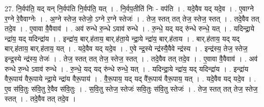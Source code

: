 \documentclass[17pt]{extarticle}
\begin{document}
27. नि॒र्वप॑ति॒ यद् यन् नि॒र्वप॑ति नि॒र्वप॑ति॒ यत् । . नि॒र्वप॒तीति॑ निः - वप॑ति । . यदे॒वैव यद् यदे॒व । . ए॒वाग्ने र॒ग्ने रे॒वैवाग्नेः । . अ॒ग्ने स्तेज॒ स्तेजो॒ ऽग्ने र॒ग्ने स्तेजः॑ । . तेज॒ स्तत् तत् तेज॒ स्तेज॒ स्तत् । . तदे॒वैव तत् तदे॒व । . ए॒वावा वै॒वैवाव॑ । . अव॑ रुन्धे रु॒न्धे ऽवाव॑ रुन्धे । . रु॒न्धे॒ यद् यद् रु॑न्धे रुन्धे॒ यत् । . यदिन्द्रा॒ये न्द्रा॑य॒ यद् यदिन्द्रा॑य । . इन्द्रा॑य॒ बार्.ह॑ताय॒ बार्.ह॑ता॒ये न्द्रा॒ये न्द्रा॑य॒ बार्.ह॑ताय । . बार्.ह॑ताय॒ यद् यद् बार्.ह॑ताय॒ बार्.ह॑ताय॒ यत् । . यदे॒वैव यद् यदे॒व । . ए॒वे न्द्र॒स्ये न्द्र॑स्यै॒वैवे न्द्र॑स्य । . इन्द्र॑स्य॒ तेज॒ स्तेज॒ इन्द्र॒स्ये न्द्र॑स्य॒ तेजः॑ । . तेज॒ स्तत् तत् तेज॒ स्तेज॒ स्तत् । . तदे॒वैव तत् तदे॒व । . ए॒वावा वै॒वैवाव॑ । . अव॑ रुन्धे रु॒न्धे ऽवाव॑ रुन्धे । . रु॒न्धे॒ यद् यद् रु॑न्धे रुन्धे॒ यत् । . यदिन्द्रा॒ये न्द्रा॑य॒ यद् यदिन्द्रा॑य । . इन्द्रा॑य वैरू॒पाय॑ वैरू॒पाये न्द्रा॒ये न्द्रा॑य वैरू॒पाय॑ । . वै॒रू॒पाय॒ यद् यद् वै॑रू॒पाय॑ वैरू॒पाय॒ यत् । . यदे॒वैव यद् यदे॒व । . ए॒व स॑वि॒तुः स॑वि॒तु रे॒वैव स॑वि॒तुः । . स॒वि॒तु स्तेज॒ स्तेजः॑ सवि॒तुः स॑वि॒तु स्तेजः॑ । . तेज॒ स्तत् तत् तेज॒ स्तेज॒ स्तत् । . तदे॒वैव तत् तदे॒व । \newline
\end{document}
